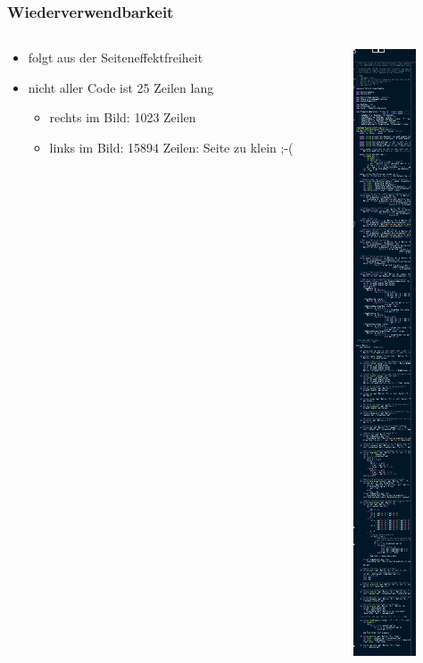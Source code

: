 \documentclass{beamer}
\begin{document}
\begin{frame}
    \frametitle{Wiederverwendbarkeit}
    \begin{columns}[c]
        \begin{column}{.7\textwidth}
            \begin{itemize}
                \item folgt aus der Seiteneffektfreiheit
                \item nicht aller Code ist 25 Zeilen lang
                \begin{itemize}
                    \item rechts im Bild: 1023 Zeilen
                    \item links im Bild: 15894 Zeilen: Seite zu klein ;-(
                \end{itemize}
            \end{itemize}
        \end{column}
        \begin{column}{.3\textwidth}
            \begin{center}
                \includegraphics[scale=0.4]{long_code.png}
            \end{center}
        \end{column}
    \end{columns}
\end{frame}
\end{document}
